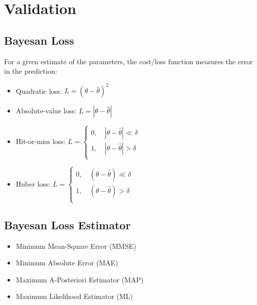 \documentclass[11pt]{article}
\begin{document}
    \section{Validation}
    
        \subsection{Bayesan Loss}
            For a given estimate of the parameters, the cost/loss function measures the error in the prediction:
            \begin{itemize}
                \item Quadratic loss: $L = (\theta - \hat{\theta})^2$
                \item Absolute-value loss: $L = |\theta - \hat{\theta}|$
                \item Hit-or-miss loss: $L = \begin{cases} 0,   \quad   |\theta - \hat{\theta}| \ll \delta \\
                                                           1,   \quad   |\theta - \hat{\theta}| > \delta \\
                                            \end{cases}$
                \item Huber loss: $L = \begin{cases} 0,   \quad     (\theta - \hat{\theta}) \ll \delta \\
                                                     1,   \quad     (\theta - \hat{\theta}) > \delta \\
                                        \end{cases}$
            \end{itemize}
    

        \subsection{Bayesan Loss Estimator}
            \begin{itemize}
                \item Minimum Mean-Square Error (MMSE)
                \item Minimum Absolute Error (MAE)
                \item Maximum A-Posteriori Estimator (MAP)
                \item Maximum Likelihood Estimator (ML)
            \end{itemize}
\end{document}
